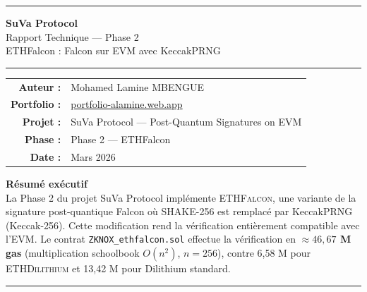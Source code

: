 \documentclass[11pt,a4paper]{article}
\newcommand{\ethfalcon}{\textsc{ETHFalcon}}
\newcommand{\ethdilithium}{\textsc{ETHDilithium}}
\begin{document}
\begin{titlepage}
  \centering
  \vspace*{1.5cm}

  {\color{suvaBlue}\rule{\linewidth}{2pt}}
  \vspace{0.5cm}

  {\Huge\bfseries\color{suvaBlue} SuVa Protocol}\\[0.3cm]
  {\LARGE\color{suvaGold} Rapport Technique — Phase 2}\\[0.2cm]
  {\Large ETHFalcon : Falcon sur EVM avec KeccakPRNG}

  \vspace{0.5cm}
  {\color{suvaBlue}\rule{\linewidth}{2pt}}

  \vspace{2cm}

  \begin{tabular}{rl}
    \textbf{Auteur :}    & Mohamed Lamine MBENGUE \\[4pt]
    \textbf{Portfolio :} & \href{https://portfolio-alamine.web.app}{portfolio-alamine.web.app} \\[4pt]
    \textbf{Projet :}    & SuVa Protocol — Post-Quantum Signatures on EVM \\[4pt]
    \textbf{Phase :}     & Phase 2 — ETHFalcon \\[4pt]
    \textbf{Date :}      & Mars 2026 \\[4pt]
  \end{tabular}

  \vfill

  \begin{tcolorbox}[colback=suvaBlue!8,colframe=suvaBlue,width=0.85\linewidth]
    \centering
    \textbf{Résumé exécutif}\\[6pt]
    La Phase 2 du projet SuVa Protocol implémente \ethfalcon{}, une variante
    de la signature post-quantique Falcon où SHAKE-256 est remplacé par
    KeccakPRNG (Keccak-256). Cette modification rend la vérification
    entièrement compatible avec l'EVM. Le contrat \texttt{ZKNOX\_ethfalcon.sol}
    effectue la vérification en \textbf{$\approx 46{,}67$ M gas} (multiplication
    schoolbook $O(n^2)$, $n=256$), contre 6,58 M pour \ethdilithium{} et
    13,42 M pour Dilithium standard.
  \end{tcolorbox}

  \vspace{1cm}
  {\color{suvaBlue}\rule{\linewidth}{1pt}}
\end{titlepage}
\end{document}
